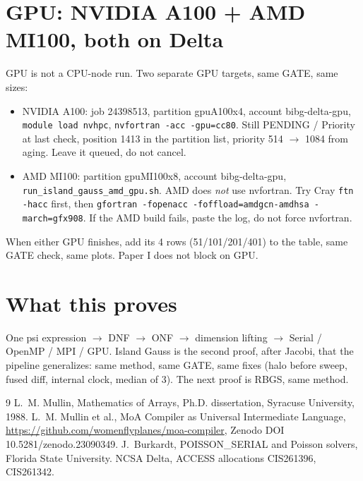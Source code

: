 \documentclass[11pt]{article}
\begin{document}
\section{GPU: NVIDIA A100 + AMD MI100, both on Delta}
GPU is not a CPU-node run. Two separate GPU targets, same GATE, same sizes:
\begin{itemize}
\item NVIDIA A100: job 24398513, partition gpuA100x4, account bibg-delta-gpu, \texttt{module load nvhpc}, \texttt{nvfortran -acc -gpu=cc80}. Still PENDING / Priority at last check, position 1413 in the partition list, priority 514 $\to$ 1084 from aging. Leave it queued, do not cancel.
\item AMD MI100: partition gpuMI100x8, account bibg-delta-gpu, \texttt{run\_island\_gauss\_amd\_gpu.sh}. AMD does \emph{not} use nvfortran. Try Cray \texttt{ftn -hacc} first, then \texttt{gfortran -fopenacc -foffload=amdgcn-amdhsa -march=gfx908}. If the AMD build fails, paste the log, do not force nvfortran.
\end{itemize}
When either GPU finishes, add its 4 rows (51/101/201/401) to the table, same GATE check, same plots. Paper I does not block on GPU.

\section{What this proves}
One psi expression $\to$ DNF $\to$ ONF $\to$ dimension lifting $\to$ Serial / OpenMP / MPI / GPU. Island Gauss is the second proof, after Jacobi, that the pipeline generalizes: same method, same GATE, same fixes (halo before sweep, fused diff, internal clock, median of 3). The next proof is RBGS, same method.

\begin{thebibliography}{9}
 L.~M. Mullin, Mathematics of Arrays, Ph.D. dissertation, Syracuse University, 1988.
 L.~M. Mullin et al., MoA Compiler as Universal Intermediate Language, \url{https://github.com/womenflyplanes/moa-compiler}, Zenodo DOI 10.5281/zenodo.23090349.
 J.~Burkardt, POISSON\_SERIAL and Poisson solvers, Florida State University.
 NCSA Delta, ACCESS allocations CIS261396, CIS261342.
\end{thebibliography}
\end{document}
